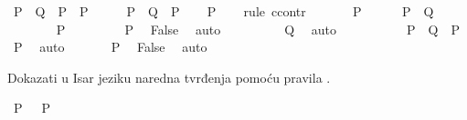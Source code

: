 \begin{isabellebody}
\begin{exercise}[subtitle=Pravilo ccontr i classical.]
\isamarkupfalse%
\ {\isachardoublequoteopen}{\isacharparenleft}{\kern0pt}{\isacharparenleft}{\kern0pt}P\ {\isasymlongrightarrow}\ Q{\isacharparenright}{\kern0pt}\ {\isasymlongrightarrow}\ P{\isacharparenright}{\kern0pt}\ {\isasymlongrightarrow}\ P{\isachardoublequoteclose}\isanewline
%
\isadelimproof
%
\endisadelimproof
%
\isatagproof
{}\isamarkupfalse%
\ \isanewline
\ \ \isamarkupfalse%
\ {\isachardoublequoteopen}{\isacharparenleft}{\kern0pt}P\ {\isasymlongrightarrow}\ Q{\isacharparenright}{\kern0pt}\ {\isasymlongrightarrow}\ P{\isachardoublequoteclose}\isanewline
\ \ \isamarkupfalse%
\ P\isanewline
\ \ \isamarkupfalse%
\ {\isacharparenleft}{\kern0pt}rule\ ccontr{\isacharparenright}{\kern0pt}\isanewline
\ \ \ \ \isamarkupfalse%
\ {\isachardoublequoteopen}{\isasymnot}\ P{\isachardoublequoteclose}\isanewline
\ \ \ \ \isamarkupfalse%
\ {\isachardoublequoteopen}P\ {\isasymlongrightarrow}\ Q{\isachardoublequoteclose}\isanewline
\ \ \ \ \isamarkupfalse%
\isanewline
\ \ \ \ \ \ \isamarkupfalse%
\ P\isanewline
\ \ \ \ \ \ \isamarkupfalse%
\ {\isacartoucheopen}{\isasymnot}\ P{\isacartoucheclose}\ \isamarkupfalse%
\ False\ \isamarkupfalse%
\ auto\isanewline
\ \ \ \ \ \ \isamarkupfalse%
\ \isamarkupfalse%
\ Q\ \isamarkupfalse%
\ auto\isanewline
\ \ \ \ \isamarkupfalse%
\isanewline
\ \ \ \ \isamarkupfalse%
\ {\isacartoucheopen}{\isacharparenleft}{\kern0pt}P\ {\isasymlongrightarrow}\ Q{\isacharparenright}{\kern0pt}\ {\isasymlongrightarrow}\ P{\isacartoucheclose}\ \isamarkupfalse%
\ {\isachardoublequoteopen}P{\isachardoublequoteclose}\ \isamarkupfalse%
\ auto\isanewline
\ \ \ \ \isamarkupfalse%
\ {\isacartoucheopen}{\isasymnot}\ P{\isacartoucheclose}\ \isamarkupfalse%
\ False\ \isamarkupfalse%
\ auto\isanewline
\ \ \isamarkupfalse%
\isanewline
{}\isamarkupfalse%
%
\endisatagproof
{\isafoldproof}%
%
\isadelimproof
%
\endisadelimproof
%
\begin{isamarkuptext}%
Dokazati u Isar jeziku naredna tvrđenja pomoću pravila .%
\end{isamarkuptext}\isamarkuptrue%
\isamarkupfalse%
\ {\isachardoublequoteopen}P\ {\isasymor}\ {\isasymnot}\ P{\isachardoublequoteclose}\isanewline
%

\end{exercise}
\end{isabellebody}
